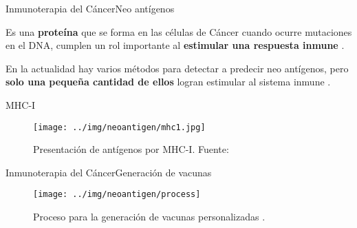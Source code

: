 \documentclass[10pt]{beamer}
\newcommand{\1}{
	\setbeamertemplate{background}{
		\texttt{[image: ../img/1]}
		\tikz[overlay] \fill[fill opacity=0.75,fill=white] (0,0) rectangle (-\paperwidth,\paperheight);
	}
}
\begin{document}
	\begin{frame}{Inmunoterapia del Cáncer}{Neo antígenos}		
		\begin{block}{}
			Es una \textbf{proteína} que se forma en las células de Cáncer cuando ocurre mutaciones en el DNA, cumplen un rol importante al \textbf{estimular una respuesta inmune} \cite{NCIdictionary2022, borden2022cancer}.
		\end{block} 
		\begin{block}{}
			En la actualidad hay varios métodos para detectar a predecir neo antígenos, pero \textbf{solo una pequeña cantidad de ellos} logran estimular al sistema inmune \cite{chen2021challenges, hao2021improvement}.
		\end{block}
	\end{frame}
	
	\begin{frame}{MHC-I}{}		
		\begin{figure}[H]
			\centering
			\texttt{[image: ../img/neoantigen/mhc1.jpg]}
			\caption{Presentación de antígenos por MHC-I. Fuente: \cite{zhang2019application}}
			\label{fig:mhc1}
		\end{figure}	
	\end{frame}

	
	\begin{frame}{Inmunoterapia del Cáncer}{Generación de vacunas}	
		\begin{figure}
			\texttt{[image: ../img/neoantigen/process]}
			\caption{Proceso para la generación de vacunas personalizadas \cite{peng2019neoantigen}.}
		\end{figure}		
	\end{frame}
	
	
\end{document}
